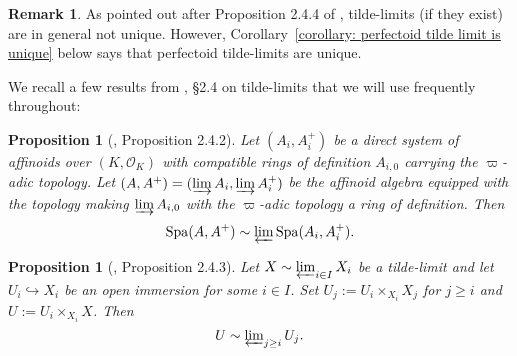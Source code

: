 \documentclass[10pt,oneside]{amsart}
\newtheorem{proposition}[theorem]{Proposition}
\theoremstyle{definition}
\newtheorem{remark}[theorem]{Remark}
\begin{document}
	\begin{remark} \label{remark:tilde_limit_non_unique}
As pointed out after Proposition 2.4.4 of \cite{SW}, tilde-limits (if they exist) are in general not unique. However, Corollary~\ref{corollary: perfectoid tilde limit is unique} below says that perfectoid tilde-limits are unique.
	\end{remark}

We recall a few results from \cite{SW}, \S2.4 on tilde-limits that we will use frequently throughout:

\begin{proposition}[\cite{SW}, Proposition 2.4.2]\label{SW Proposition 2.4.2}
	Let $(A_i,A_i^{+})$ be a direct system of affinoids over $(K,\mathcal O_K)$ with compatible rings of definition $A_{i,0}$ carrying the $\varpi$-adic topology. Let $(A,A^{+})=(\varinjlim A_i,\varinjlim A_i^{+})$ be the affinoid algebra equipped with the topology making $\varinjlim A_{i,0}$ with the $\varpi$-adic topology a ring of definition. Then
	\[\operatorname{Spa}(A,A^{+})\sim \textstyle\varprojlim \operatorname{Spa}(A_i,A_i^{+}).\]
\end{proposition}
\begin{proposition}[\cite{SW}, Proposition 2.4.3]\label{SW Proposition 2.4.3}
	Let $X\sim \varprojlim_{i\in I} X_i$ be a tilde-limit and let $U_i\hookrightarrow X_i$ be an open immersion for some $i\in I$. Set $U_j:=U_i\times_{X_i}X_j$ for $j\geq i$ and $U:=U_i\times_{X_i}X$. Then 
	\[U\sim \textstyle\varprojlim_{j\geq i} U_j.\]
\end{proposition}
\end{document}
